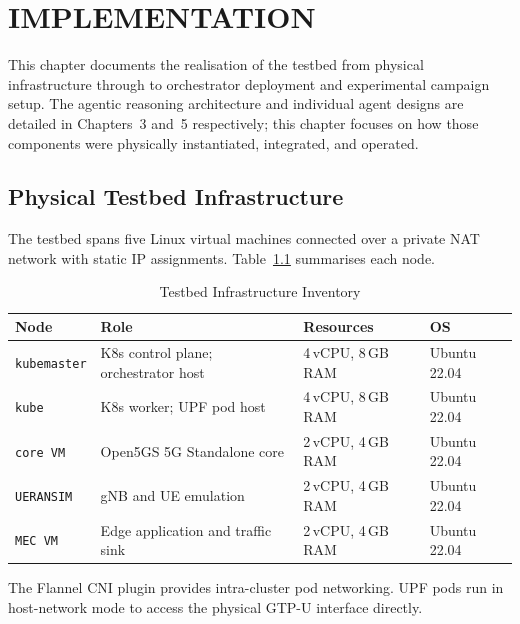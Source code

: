 
\chapter{IMPLEMENTATION}

This chapter documents the realisation of the testbed from physical infrastructure
through to orchestrator deployment and experimental campaign setup. The agentic
reasoning architecture and individual agent designs are detailed in
Chapters~3 and~5 respectively; this chapter focuses on how those components
were physically instantiated, integrated, and operated.

\section{Physical Testbed Infrastructure}

The testbed spans five Linux virtual machines connected over a private NAT network
with static IP assignments. Table~\ref{tab:infrastructure} summarises each node.

\begin{table}[H]
\centering
\caption{Testbed Infrastructure Inventory}
\label{tab:infrastructure}
\begin{tabular}{p{2.6cm}p{3.4cm}p{3.0cm}p{2.8cm}}
\toprule
\textbf{Node} & \textbf{Role} & \textbf{Resources} & \textbf{OS} \\
\midrule
\texttt{kubemaster} & K8s control plane; orchestrator host & 4\,vCPU, 8\,GB RAM & Ubuntu 22.04 \\
\texttt{kube}       & K8s worker; UPF pod host             & 4\,vCPU, 8\,GB RAM & Ubuntu 22.04 \\
\texttt{core VM}    & Open5GS 5G Standalone core           & 2\,vCPU, 4\,GB RAM & Ubuntu 22.04 \\
\texttt{UERANSIM}   & gNB and UE emulation                 & 2\,vCPU, 4\,GB RAM & Ubuntu 22.04 \\
\texttt{MEC VM}     & Edge application and traffic sink    & 2\,vCPU, 4\,GB RAM & Ubuntu 22.04 \\
\bottomrule
\end{tabular}
\end{table}

The Flannel CNI plugin provides intra-cluster pod networking.
UPF pods run in host-network mode to access the physical GTP-U interface directly.

